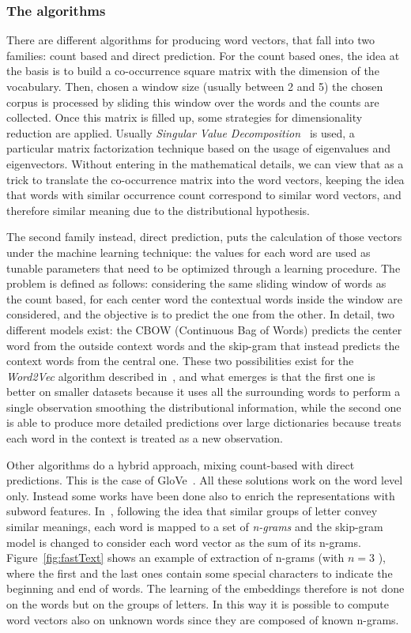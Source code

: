 \subsubsection{The algorithms}
There are different algorithms for producing word vectors, that fall into two families: count based and direct prediction. For the count based ones, the idea at the basis is to build a co-occurrence square matrix with the dimension of the vocabulary. Then, chosen a window size (usually between 2 and 5) the chosen corpus is processed by sliding this window over the words and the counts are collected. Once this matrix is filled up, some strategies for dimensionality reduction are applied. Usually \textit{Singular Value Decomposition~\cite{golub1970singular}} is used, a particular matrix factorization technique based on the usage of eigenvalues and eigenvectors. Without entering in the mathematical details, we can view that as a trick to translate the co-occurrence matrix into the word vectors, keeping the idea that words with similar occurrence count correspond to similar word vectors, and therefore similar meaning due to the distributional hypothesis.

The second family instead, direct prediction, puts the calculation of those vectors under the machine learning technique: the values for each word are used as tunable parameters that need to be optimized through a learning procedure. The problem is defined as follows: considering the same sliding window of words as the count based, for each center word the contextual words inside the window are considered, and the objective is to predict the one from the other. In detail, two different models exist: the CBOW (Continuous Bag of Words) predicts the center word from the outside context words and the skip-gram that instead predicts the context words from the central one. These two possibilities exist for the \textit{Word2Vec }algorithm described in~\cite{mikolov2013efficient}, and what emerges is that the first one is better on smaller datasets because it uses all the surrounding words to perform a single observation smoothing the distributional information, while the second one is able to produce more detailed predictions over large dictionaries because treats each word in the context is treated as a new observation.

Other algorithms do a hybrid approach, mixing count-based with direct predictions. This is the case of GloVe~\cite{pennington2014glove}. All these solutions work on the word level only. Instead some works have been done also to enrich the representations with subword features. In~\cite{bojanowski2016enriching}, following the idea that similar groups of letter convey similar meanings, each word is mapped to a set of \textit{n-grams} and the skip-gram model is changed to consider each word vector as the sum of its n-grams. Figure~\ref{fig:fastText} shows an example of extraction of n-grams (with  \( n=3 \) ), where the first and the last ones contain some special characters to indicate the beginning and end of words. The learning of the embeddings therefore is not done on the words but on the groups of letters. In this way it is possible to compute word vectors also on unknown words since they are composed of known n-grams.


